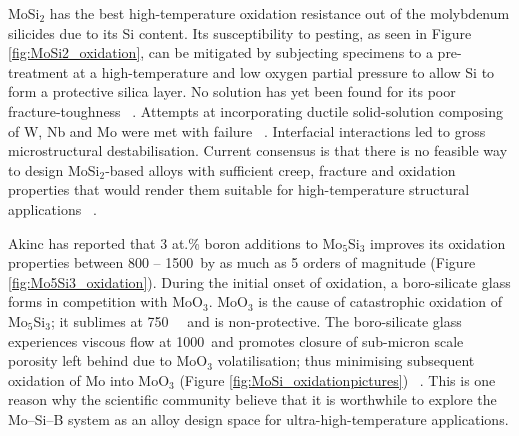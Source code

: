 MoSi$_2$ has the best high-temperature oxidation resistance out of the molybdenum silicides due to its Si content.  Its susceptibility to pesting, as seen in Figure \ref{fig:MoSi2_oxidation}, can be mitigated by subjecting specimens to a pre-treatment at a high-temperature and low oxygen partial pressure to allow Si to form a protective silica layer.  No solution has yet been found for its poor fracture-toughness ~\cite{anton89, kishida10, shah95, shah92}.  Attempts at incorporating ductile solid-solution composing of W, Nb and Mo were met with failure ~\cite{dimiduk03}.  Interfacial interactions led to gross microstructural destabilisation.  Current consensus is that there is no feasible way to design MoSi$_2$-based alloys with sufficient creep, fracture and oxidation properties that would render them suitable for high-temperature structural applications ~\cite{dimiduk03, sekido07}.

Akinc has reported that 3 at.\% boron additions to Mo$_5$Si$_3$ improves its oxidation properties between 800 -- 1500\celsius\ by as much as 5 orders of magnitude (Figure \ref{fig:Mo5Si3_oxidation}).  During the initial onset of oxidation, a boro-silicate glass forms in competition with MoO$_3$.  MoO$_3$ is the cause of catastrophic oxidation of Mo$_5$Si$_3$; it sublimes at 750\celsius\ ~\cite{brewer90} and is non-protective.  The boro-silicate glass experiences viscous flow at 1000\celsius\ and promotes closure of sub-micron scale porosity left behind due to MoO$_3$ volatilisation; thus minimising subsequent oxidation of Mo into MoO$_3$ (Figure \ref{fig:MoSi_oxidationpictures}) ~\cite{akinc99}.  This is one reason why the scientific community believe that it is worthwhile to explore the Mo--Si--B system as an alloy design space for ultra-high-temperature applications. 


